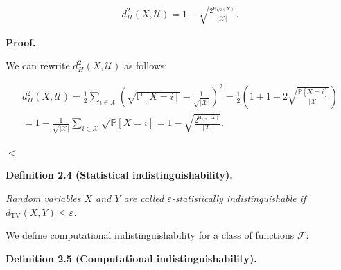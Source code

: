 \[\begin{gathered}
d_{H}^{2}\left(X,\mathcal{U}\right)=1-\sqrt{\frac{2^{\mathrm{H}_{1/2}\left(X\right)}}{|\mathcal{X}|}}.
\end{gathered}\]






\par\medskip\noindent\textbf{
\textbf{Proof}.}\par




We can rewrite $d_{H}^{2}\left(X,\mathcal{U}\right)$ as follows:\par


\[\begin{gathered}
\displaystyle d_{H}^{2}\left(X,\mathcal{U}\right) \displaystyle=\frac{1}{2}\sum_{i\in\mathcal{X}}\left(\sqrt{\mathbb{P}[X=i]}-\frac{1}{\sqrt{|\mathcal{X}|}}\right)^{2}=\frac{1}{2}\left(1+1-2\sqrt{\frac{\mathbb{P}[X=i]}{|\mathcal{X}|}}\right) \\
\displaystyle=1-\frac{1}{\sqrt{|\mathcal{X}|}}\sum_{i\in\mathcal{X}}\sqrt{\mathbb{P}[X=i]}=1-\sqrt{\frac{2^{\mathrm{H}_{1/2}\left(X\right)}}{|\mathcal{X}|}}.\
\end{gathered}\]


$\vartriangleleft$\par





\par\medskip\noindent\textbf{
\textbf{Definition 2.4}\textbf{ }(Statistical indistinguishability)\textbf{.}
}\par



\emph{Random variables $X$ and $Y$ are called $\varepsilon$-statistically indistinguishable if $d_{\mathrm{TV}}(X,Y)\leq\varepsilon$.}\par






We define computational indistinguishability for a class of functions $\mathcal{F}$:\par





\par\medskip\noindent\textbf{
\textbf{Definition 2.5}\textbf{ }(Computational indistinguishability)\textbf{.}
}\par



